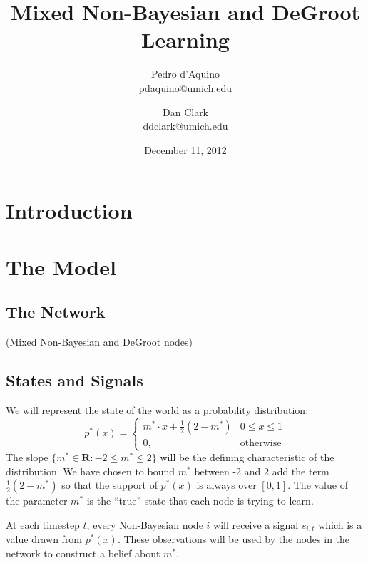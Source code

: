 \documentclass[a4paper,12pt]{article}
\begin{document}
\title{Mixed Non-Bayesian and DeGroot Learning}
\author{Pedro d'Aquino\\pdaquino@umich.edu \and Dan Clark\\ddclark@umich.edu}
\date{December 11, 2012}

\maketitle

\section{Introduction}

\cite{Jadbabaie2012}
\cite{DeGroot1974}

\section{The Model}

\subsection{The Network}

(Mixed Non-Bayesian and DeGroot nodes)

\subsection{States and Signals}

We will represent the state of the world as a probability distribution:
\begin{equation}
p^*(x)=\begin{cases}
m^* \cdot x + \frac{1}{2}(2-m^*) & 0 \le x \le 1 \\
0, & \text{otherwise}
\end{cases}
\end{equation}
The slope $\{ m^* \in \mathbf{R} : -2 \le m^* \le 2 \}$ will be the defining characteristic of the distribution.  We have chosen to bound $m^*$ between -2 and 2 add the term $\frac{1}{2}(2-m^*)$ so that the support of $p^*(x)$  is always over $[0,1]$.  The value of the parameter $m^*$ is the ``true'' state that each node is trying to learn.

At each timestep $t$, every Non-Bayesian node $i$ will receive a signal $s_{i,t}$ which is a value drawn from $p^*(x)$.  These observations will be used by the nodes in the network to construct a belief about $m^*$.
\end{document}
